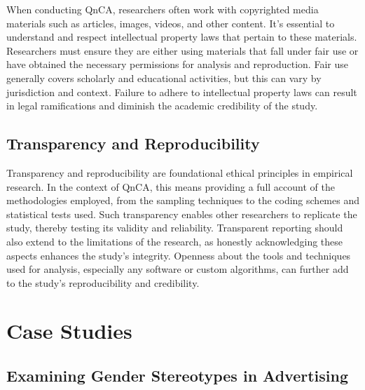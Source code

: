\documentclass[
  b5paper]{book}
\begin{document}
When conducting QnCA, researchers often work with copyrighted media materials such as articles, images, videos, and other content. It's essential to understand and respect intellectual property laws that pertain to these materials. Researchers must ensure they are either using materials that fall under fair use or have obtained the necessary permissions for analysis and reproduction. Fair use generally covers scholarly and educational activities, but this can vary by jurisdiction and context. Failure to adhere to intellectual property laws can result in legal ramifications and diminish the academic credibility of the study.

\hypertarget{transparency-and-reproducibility}{%
\subsection*{Transparency and Reproducibility}\label{transparency-and-reproducibility}}

Transparency and reproducibility are foundational ethical principles in empirical research. In the context of QnCA, this means providing a full account of the methodologies employed, from the sampling techniques to the coding schemes and statistical tests used. Such transparency enables other researchers to replicate the study, thereby testing its validity and reliability. Transparent reporting should also extend to the limitations of the research, as honestly acknowledging these aspects enhances the study's integrity. Openness about the tools and techniques used for analysis, especially any software or custom algorithms, can further add to the study's reproducibility and credibility.

\hypertarget{case-studies-3}{%
\section{Case Studies}\label{case-studies-3}}

\hypertarget{examining-gender-stereotypes-in-advertising}{%
\subsection*{Examining Gender Stereotypes in Advertising}\label{examining-gender-stereotypes-in-advertising}}
\end{document}
